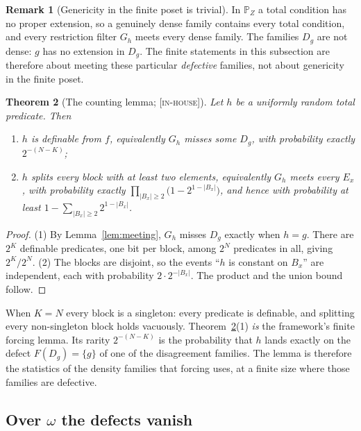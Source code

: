 \documentclass[11pt]{article}
\newcommand{\Cgen}{\mathbb{P}}                 \newcommand{\Fn}{\operatorname{Fn}}
\newcommand{\gradetag}[1]{\textnormal{\textsc{[#1]}}}
\newcommand{\inhouse}{\gradetag{in-house}}
\newtheorem{theorem}{Theorem}[section]
\theoremstyle{definition}
\newtheorem{remark}[theorem]{Remark}
\begin{document}
\begin{remark}[Genericity in the finite poset is trivial]\label{rem:finitegeneric}
In $\Cgen_Z$ a total condition has no proper extension, so a genuinely dense family contains
every total condition, and every restriction filter $G_h$ meets every dense family. The families
$D_g$ are not dense: $g$ has no extension in $D_g$. The finite statements in this subsection are therefore about meeting
these particular \emph{defective} families, not about genericity in the finite poset.
\end{remark}

\begin{theorem}[The counting lemma; \inhouse]\label{thm:counting}
Let $h$ be a uniformly random total predicate. Then
\begin{enumerate}\itemsep0pt
\item $h$ is definable from $f$, equivalently $G_h$ misses some $D_g$, with probability exactly
$2^{-(N-K)}$;
\item $h$ splits every block with at least two elements, equivalently $G_h$ meets every $E_x$, with
probability exactly $\prod_{|B_x|\ge2}\bigl(1-2^{1-|B_x|}\bigr)$, and hence with probability at
least $1-\sum_{|B_x|\ge2}2^{1-|B_x|}$.
\end{enumerate}
\end{theorem}

\begin{proof}
(1) By Lemma~\ref{lem:meeting}, $G_h$ misses $D_g$ exactly when $h=g$. There are $2^K$ definable
predicates, one bit per block, among $2^N$ predicates in all, giving $2^K/2^N$. (2) The blocks are
disjoint, so the events ``$h$ is constant on $B_x$'' are independent, each with probability
$2\cdot2^{-|B_x|}$. The product and the union bound follow.
\end{proof}

When $K=N$ every block is a singleton: every predicate is definable, and splitting every
non-singleton block holds vacuously. Theorem~\ref{thm:counting}(1) \emph{is} the framework's
finite forcing lemma. Its rarity $2^{-(N-K)}$ is the probability that $h$ lands exactly on the
defect $F(D_g)=\{g\}$ of one of the disagreement families. The lemma is therefore the statistics of
the density families that forcing uses, at a finite size where those families are defective.

\subsection{Over \texorpdfstring{$\omega$}{omega} the defects vanish}\label{ssec:vanish}
\end{document}
